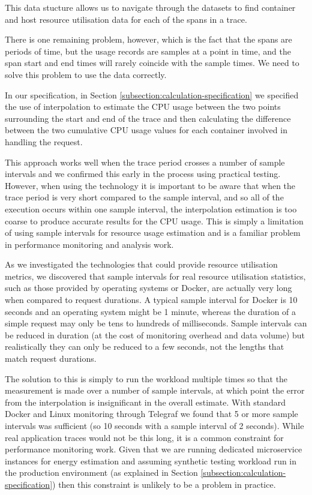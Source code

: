 This data stucture allows us to navigate through the datasets to find container and host resource utilisation data for each of the spans in a trace.

There is one remaining problem, however, which is the fact that the spans are periods of time, but the usage records are samples at a point in time, and the span start and end times will rarely coincide with the sample times.  We need to solve this problem to use the data correctly.

In our specification, in Section \ref{subsection:calculation-specification} we specified the use of interpolation to estimate the CPU usage between the two points surrounding the start and end of the trace and then calculating the difference between the two cumulative CPU usage values for each container involved in handling the request.  

This approach works well when the trace period crosses a number of sample intervals and we confirmed this early in the process using practical testing.  However, when using the technology it is important to be aware that when the trace period is very short compared to the sample interval, and so all of the execution occurs within one sample interval, the interpolation estimation is too coarse to produce accurate results for the CPU usage.  This is simply a limitation of using sample intervals for resource usage estimation and is a familiar problem in performance monitoring and analysis work.

As we investigated the technologies that could provide resource utilisation metrics, we discovered that sample intervals for real resource utilisation statistics, such as those provided by operating systems or Docker, are actually very long when compared to request durations.  A typical sample interval for Docker is 10 seconds and an operating system might be 1 minute, whereas the duration of a simple request may only be tens to hundreds of milliseconds.  Sample intervals can be reduced in duration (at the cost of monitoring overhead and data volume) but realistically they can only be reduced to a few seconds, not the lengths that match request durations.

The solution to this is simply to run the workload multiple times so that the measurement is made over a number of sample intervals, at which point the error from the interpolation is insignificant in the overall estimate.  With standard Docker and Linux monitoring through Telegraf we found that 5 or more sample intervals was sufficient (so 10 seconds with a sample interval of 2 seconds).  While real application traces would not be this long, it is a common constraint for performance monitoring work.  Given that we are running dedicated microservice instances for energy estimation and assuming synthetic testing workload run in the production environment (as explained in Section \ref{subsection:calculation-specification}) then this constraint is unlikely to be a problem in practice.



